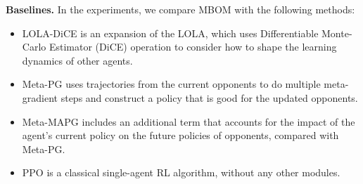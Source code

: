 \documentclass{article}
\begin{document}
\textbf{Baselines.} In the experiments, we compare {MBOM} with the following methods:  
\vspace{-2mm}
\begin{itemize}[leftmargin = 2em]
	\setlength\itemsep{0em}
	\item {LOLA-DiCE} \citep{foerster2018dice} is an expansion of the LOLA, which uses Differentiable Monte-Carlo Estimator (DiCE) operation to consider how to shape the learning dynamics of other agents. 
	\item {Meta-PG} \citep{shedivat2017continuous} uses trajectories from the current opponents to do multiple meta-gradient steps and construct a policy that is good for the updated opponents.
	\item {Meta-MAPG} \citep{kim2021policy} includes an additional term that accounts for the impact of the agent’s current policy on the future policies of opponents, compared with Meta-PG. 
	\item {PPO} \citep{schulman2017proximal} is a classical single-agent RL algorithm, without any other modules.
\end{itemize}
\vspace{-1mm}
\end{document}
